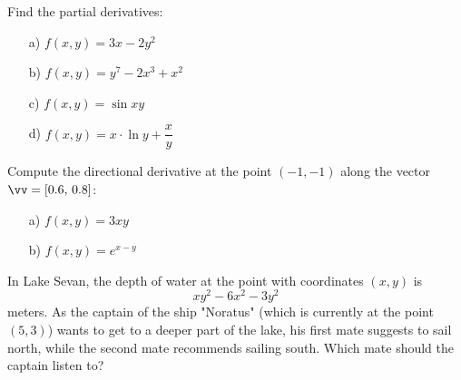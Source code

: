 \begin{problem}
Find the partial derivatives:
\begin{enumerate}
        \item[a) ] $f(x,y)=3x-2y^2$
        \item[b) ] $f(x,y)=y^7-2x^3+x^2$
        \item[c) ] $f(x,y)=\sin{xy}$
        \item[d) ] $f(x,y)=x \cdot \ln y+\dfrac{x}{y}$
    \end{enumerate}
\end{problem}
\medskip 


\begin{problem}
Compute the directional derivative  at the point $(-1,-1)$ along the vector $\vv=[0.6,\,0.8]$:
\begin{enumerate}
    \item[a) ] $f(x,y) = 3xy$
    \item[b) ] $f(x,y) = e^{x-y}$
    \end{enumerate}
\end{problem}


\medskip 


\begin{problem}
In Lake Sevan, the depth of water at the point with coordinates
$(x,y)$ is 
\[xy^{2}-6x^{2}-3y^{2}\]
meters. As the captain of the ship "Noratus" (which is currently at the point $(5, 3)$) wants to get to a deeper part of the lake,  his first mate suggests to sail north, while the second mate recommends sailing south. Which mate should the captain listen to?
\end{problem}



    

\medskip


